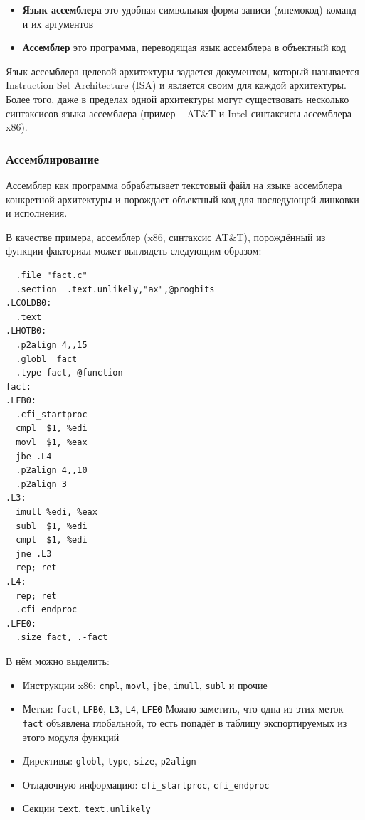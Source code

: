 \documentclass[a4paper,12pt,oneside]{article}
\begin{document}
\begin{itemize}
\item \textbf{Язык ассемблера} это удобная символьная форма записи (мнемокод) команд и их аргументов
\item \textbf{Ассемблер} это программа, переводящая язык ассемблера в объектный код
\end{itemize}

Язык ассемблера целевой архитектуры задается документом, который называется Instruction Set Architecture (ISA) и является своим для каждой архитектуры. Более того, даже в пределах одной архитектуры могут существовать несколько синтаксисов языка ассемблера (пример -- AT\&T и Intel синтаксисы ассемблера x86).

\subsubsection{Ассемблирование}\label{subsubsec:Assembling}

Ассемблер как программа обрабатывает текстовый файл на языке ассемблера конкретной архитектуры и порождает объектный код для последующей линковки и исполнения.

В качестве примера, ассемблер (x86, синтаксис AT\&T), порождённый из функции факториал может выглядеть следующим образом:

\begin{verbatim}
  .file "fact.c"
  .section  .text.unlikely,"ax",@progbits
.LCOLDB0:
  .text
.LHOTB0:
  .p2align 4,,15
  .globl  fact
  .type fact, @function
fact:
.LFB0:
  .cfi_startproc
  cmpl  $1, %edi
  movl  $1, %eax
  jbe .L4
  .p2align 4,,10
  .p2align 3
.L3:
  imull %edi, %eax
  subl  $1, %edi
  cmpl  $1, %edi
  jne .L3
  rep; ret
.L4:
  rep; ret
  .cfi_endproc
.LFE0:
  .size fact, .-fact
\end{verbatim}

В нём можно выделить: 

\begin{itemize}
\item Инструкции x86: \lstinline!cmpl!, \lstinline!movl!, \lstinline!jbe!, \lstinline!imull!, \lstinline!subl! и прочие
\item Метки: \lstinline!fact!, \lstinline!LFB0!, \lstinline!L3!, \lstinline!L4!, \lstinline!LFE0!
Можно заметить, что одна из этих меток -- \lstinline!fact! объявлена глобальной, то есть попадёт в таблицу экспортируемых из этого модуля функций
\item Директивы: \lstinline!globl!, \lstinline!type!, \lstinline!size!, \lstinline!p2align!
\item Отладочную информацию: \lstinline!cfi_startproc!, \lstinline!cfi_endproc!
\item Секции \lstinline!text!, \lstinline!text.unlikely!
\end{itemize}
\end{document}
